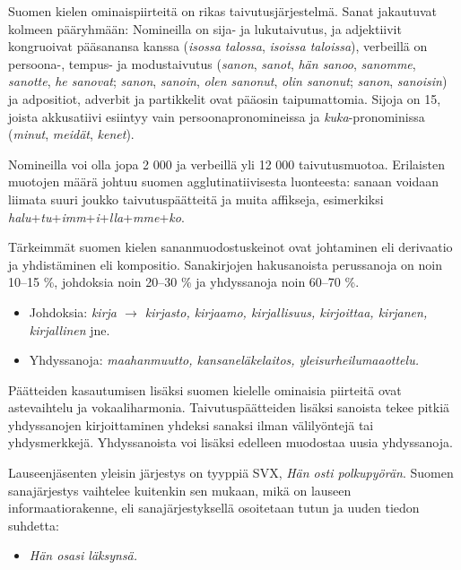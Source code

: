 \documentclass[]{../../metanetpaper}
\begin{document}
\begin{Parallel}[c]{70mm}{70mm}
{%



Suomen kielen ominaispiirteitä on rikas taivutusjärjestelmä. Sanat jakautuvat
kolmeen pääryhmään: Nomineilla on sija- ja lukutaivutus, ja adjektiivit
kongruoivat pääsanansa kanssa (\textit{isossa talossa}, \textit{isoissa taloissa}), verbeillä on
persoona-, tempus- ja modustaivutus (\textit{sanon}, \textit{sanot}, \textit{hän sanoo}, \textit{sanomme}, \textit{sanotte},
\textit{he sanovat}; \textit{sanon}, \textit{sanoin}, \textit{olen sanonut}, \textit{olin sanonut}; \textit{sanon}, \textit{sanoisin}) ja
adpositiot, adverbit ja partikkelit ovat pääosin taipumattomia. Sijoja on 15,
joista akkusatiivi esiintyy vain persoonapronomineissa ja \textit{kuka}-pronominissa (\textit{minut}, \textit{meidät}, \textit{kenet}).



Nomineilla voi olla jopa 2 000 ja verbeillä yli 12 000 taivutusmuotoa.
Erilaisten muotojen määrä johtuu suomen agglutinatiivisesta luonteesta: sanaan
voidaan liimata suuri joukko taivutuspäätteitä ja muita affikseja, esimerkiksi
\textit{halu}+\textit{tu}+\textit{imm}+\textit{i}+\textit{lla}+\textit{mme}+\textit{ko}.

Tärkeimmät suomen kielen sananmuodostuskeinot ovat johtaminen eli derivaatio ja
yhdistäminen eli kompositio. Sanakirjojen hakusanoista perussanoja on noin
10–15 \%, johdoksia noin 20–30 \% ja yhdyssanoja noin 60–70 \%.
\begin{itemize}
\item Johdoksia: \textit{kirja $\to$ kirjasto, kirjaamo, kirjallisuus, kirjoittaa, kirjanen,
    kirjallinen} jne.

\item Yhdyssanoja: \textit{maahanmuutto, kansaneläkelaitos, yleisurheilumaaottelu.}
\end{itemize}

Päätteiden kasautumisen lisäksi suomen kielelle ominaisia piirteitä ovat
astevaihtelu ja vokaaliharmonia. Taivutuspäätteiden lisäksi sanoista tekee
pitkiä yhdyssanojen kirjoittaminen yhdeksi sanaksi ilman välilyöntejä tai
yhdysmerkkejä. Yhdyssanoista voi lisäksi edelleen muodostaa uusia yhdyssanoja.

Lauseenjäsenten yleisin järjestys on tyyppiä SVX, \textit{Hän osti polkupyörän}. Suomen
sanajärjestys vaihtelee kuitenkin sen mukaan, mikä on lauseen
informaatiorakenne, eli sanajärjestyksellä osoitetaan tutun ja uuden tiedon
suhdetta:
\begin{itemize}
\item \textit{Hän osasi läksynsä.}


\end{itemize}}
\end{Parallel}
\end{document}
